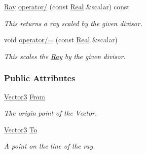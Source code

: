 \begin{DoxyCompactItemize}
\hyperlink{classMezzanine_1_1Ray}{Ray} \hyperlink{classMezzanine_1_1Ray_a6ebf84f9c9e6d77a3155ed04be4ac71e}{operator/} (const \hyperlink{namespaceMezzanine_a726731b1a7df72bf3583e4a97282c6f6}{Real} \&scalar) const 
\begin{DoxyCompactList}\small\item\em This returns a ray scaled by the given divisor. \item\end{DoxyCompactList}\item 
void \hyperlink{classMezzanine_1_1Ray_a4b66bd341d7f5e2bfc86cca7f2d665b9}{operator/=} (const \hyperlink{namespaceMezzanine_a726731b1a7df72bf3583e4a97282c6f6}{Real} \&scalar)
\begin{DoxyCompactList}\small\item\em This scales the \hyperlink{classMezzanine_1_1Ray}{Ray} by the given divisor. \item\end{DoxyCompactList}\end{DoxyCompactItemize}
\subsubsection*{Public Attributes}
\begin{DoxyCompactItemize}
\item 
\hypertarget{classMezzanine_1_1Ray_ab4bd29b181c9a2b405ca320ccf9b5b37}{
\hyperlink{classMezzanine_1_1Vector3}{Vector3} \hyperlink{classMezzanine_1_1Ray_ab4bd29b181c9a2b405ca320ccf9b5b37}{From}}
\label{classMezzanine_1_1Ray_ab4bd29b181c9a2b405ca320ccf9b5b37}

\begin{DoxyCompactList}\small\item\em The origin point of the Vector. \item\end{DoxyCompactList}\item 
\hypertarget{classMezzanine_1_1Ray_a40c41932b49c6b8b04b2558952503d1f}{
\hyperlink{classMezzanine_1_1Vector3}{Vector3} \hyperlink{classMezzanine_1_1Ray_a40c41932b49c6b8b04b2558952503d1f}{To}}
\label{classMezzanine_1_1Ray_a40c41932b49c6b8b04b2558952503d1f}

\begin{DoxyCompactList}\small\item\em A point on the line of the ray. \item\end{DoxyCompactList}\end{DoxyCompactItemize}



